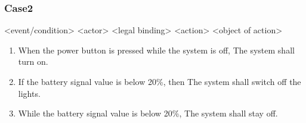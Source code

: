 \subsubsection*{Case2}
	\begin{mybox}
		\centering
		\textcolor{winered}{<event/condition>} \textcolor{mybule}{<actor>} \textcolor{mypurple}{<legal binding>} \textcolor{mygreen1}{<action>} \textcolor{mygreen2}{<object of action>}
	\end{mybox}


	\begin{enumerate}
		\item \textcolor{winered}{When the power button is pressed while the system is off}, \textcolor{mybule}{The system} \textcolor{mypurple}{shall} \textcolor{mygreen1}{turn on}.
		\item \textcolor{winered}{If the battery signal value is below 20\%}, then \textcolor{mybule}{The system} \textcolor{mypurple}{shall}  \textcolor{mygreen1}{switch off} \textcolor{mygreen2}{the lights}.
		\item \textcolor{winered}{While the battery signal value is below 20\%}, \textcolor{mybule}{The system} \textcolor{mypurple}{shall} \textcolor{mygreen1}{stay off}.
	\end{enumerate}











